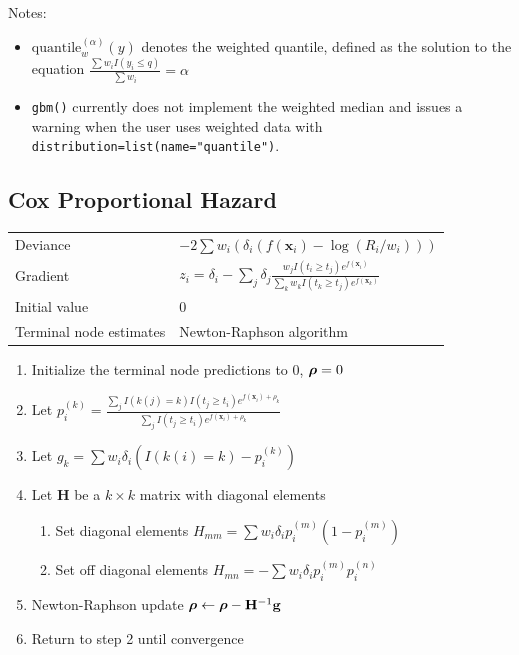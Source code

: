 \documentclass{article}
\newcommand{\mathgbf}[1]{{\mbox{\boldmath$#1$\unboldmath}}}
\begin{document}
Notes: \begin{itemize} \item $\mathrm{quantile}^{(\alpha)}_w(y)$
  denotes the weighted quantile, defined as the solution to the
  equation $\frac{\sum w_iI(y_i\leq q)}{\sum w_i}=\alpha$ \item
  \texttt{gbm()} currently does not implement the weighted median and
  issues a warning when the user uses weighted data with
  \texttt{distribution=list(name="quantile")}. \end{itemize}


\subsection{Cox Proportional Hazard}

\begin{tabular}{ll} Deviance & $-2\sum w_i(\delta_i(f(\mathbf{x}_i)-\log(R_i/w_i)))$\\ Gradient & $\displaystyle z_i=\delta_i - \sum_j \delta_j
            \frac{w_jI(t_i\geq t_j)e^{f(\mathbf{x}_i)}}
                 {\sum_k w_kI(t_k\geq t_j)e^{f(\mathbf{x}_k)}}$ \\
Initial value & 0 \\ Terminal node estimates & Newton-Raphson algorithm \end{tabular}

\begin{enumerate}
  \item Initialize the terminal node predictions to 0, $\mathgbf{\rho}=0$
  \item Let $\displaystyle
             p_i^{(k)}=\frac{\sum_j I(k(j)=k)I(t_j\geq t_i)e^{f(\mathbf{x}_i)+\rho_k}}
                            {\sum_j I(t_j\geq t_i)e^{f(\mathbf{x}_i)+\rho_k}}$
  \item Let $g_k=\sum w_i\delta_i\left(I(k(i)=k)-p_i^{(k)}\right)$
  \item Let $\mathbf{H}$ be a $k\times k$ matrix with diagonal elements
  \begin{enumerate}
     \item Set diagonal elements $H_{mm}=\sum w_i\delta_i p_i^{(m)}\left(1-p_i^{(m)}\right)$
     \item Set off diagonal elements $H_{mn}=-\sum w_i\delta_i p_i^{(m)}p_i^{(n)}$
  \end{enumerate}
  \item Newton-Raphson update $\mathgbf{\rho} \leftarrow \mathgbf{\rho} - \mathbf{H}^{-1}\mathbf{g}$
  \item Return to step 2 until convergence
\end{enumerate}
\end{document}
